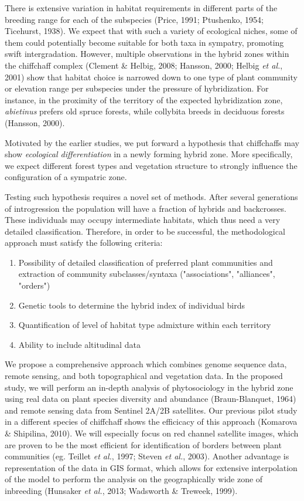 \documentclass[11pt,a4paper]{article}
\begin{document}
There is extensive variation in habitat requirements in different parts of the breeding range for each of the subspecies (Price, 1991; Ptushenko, 1954; Ticehurst, 1938). We expect that with such a variety of ecological niches, some of them could potentially become suitable for both taxa in sympatry, promoting swift intergradation. However, multiple observations in the hybrid zones within the chiffchaff complex (Clement \& Helbig, 2008; Hansson, 2000; Helbig \textit{et al.}, 2001) show that habitat choice is narrowed down to one type of plant community or elevation range per subspecies under the pressure of hybridization. For instance, in the proximity of the territory of the expected hybridization zone, \textit{abietinus} prefers old spruce forests, while collybita breeds in deciduous forests (Hansson, 2000). 

Motivated by the earlier studies, we put forward a hypothesis that chiffchaffs may show \textit{ecological differentiation} in a newly forming hybrid zone. More specifically, we expect different forest types and vegetation structure to strongly influence the configuration of a sympatric zone.  

Testing such hypothesis requires a novel set of methods. After several generations of introgression the population will have a fraction of hybrids and backcrosses. These individuals may occupy intermediate habitats, which thus need a very detailed classification. Therefore, in order to be successful, the methodological approach must satisfy the following criteria:
\begin{enumerate}
\item Possibility of detailed classification of preferred plant communities and extraction of community subclasses/syntaxa ("associations", "alliances", "orders")
\item	Genetic tools to determine the hybrid index of individual birds
\item	Quantification of level of habitat type admixture within each territory
\item	Ability to include altitudinal data
\end{enumerate}

We propose a comprehensive approach which combines genome sequence data, remote sensing, and both topographical and vegetation data. In the proposed study, we will perform an in-depth analysis of phytosociology in the hybrid zone using real data on plant species diversity and abundance (Braun-Blanquet, 1964) and remote sensing data from Sentinel 2A/2B satellites. Our previous pilot study in a different species of chiffchaff shows the efficicacy of this approach (Komarova \& Shipilina, 2010). We will especially focus on red channel satellite images, which are proven to be the most efficient for identification of borders between plant communities (eg. Teillet \textit{et al.}, 1997; Steven \textit{et al.}, 2003). Another advantage is representation of the data in GIS format, which allows for extensive interpolation of the model to perform the analysis on the geographically wide zone of inbreeding (Hunsaker \textit{et al.}, 2013; Wadsworth \& Treweek, 1999). 
\end{document}

